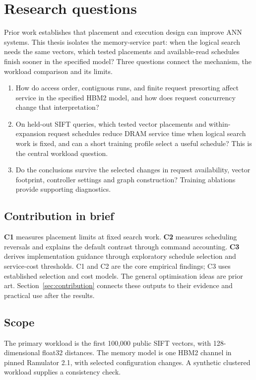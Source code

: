 \documentclass[11pt,a4paper]{report}
\begin{document}
\chapter{Research questions}
\label{ch:intro}
Prior work establishes that placement and execution design can improve ANN systems. This thesis isolates the memory-service part: when the logical search needs the same vectors, which tested placements and available-read schedules finish sooner in the specified model? Three questions connect the mechanism, the workload comparison and its limits.

\begin{enumerate}[label=RQ\arabic*.]
\item How do access order, contiguous runs, and finite request presorting affect service in the specified HBM2 model, and how does request concurrency change that interpretation?
\item On held-out SIFT queries, which tested vector placements and within-expansion request schedules reduce DRAM service time when logical search work is fixed, and can a short training profile select a useful schedule? This is the central workload question.
\item Do the conclusions survive the selected changes in request availability, vector footprint, controller settings and graph construction? Training ablations provide supporting diagnostics.
\end{enumerate}

\section{Contribution in brief}
\textbf{C1} measures placement limits at fixed search work. \textbf{C2} measures scheduling reversals and explains the default contrast through command accounting. \textbf{C3} derives implementation guidance through exploratory schedule selection and service-cost thresholds. C1 and C2 are the core empirical findings; C3 uses established selection and cost models. The general optimisation ideas are prior art. Section~\ref{sec:contribution} connects these outputs to their evidence and practical use after the results.

\section{Scope}
The primary workload is the first 100,000 public SIFT vectors, with 128-dimensional float32 distances. The memory model is one HBM2 channel in pinned Ramulator 2.1, with selected configuration changes. A synthetic clustered workload supplies a consistency check.
\end{document}
